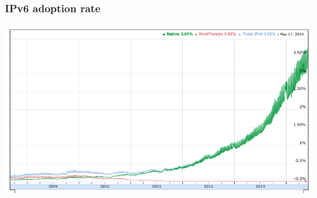 \documentclass[12pt,leqno,fleqn]{beamer}
\begin{document}

\begin{frame}
\frametitle{IPv6 adoption rate}
\includegraphics[keepaspectratio=true,width=1\textwidth]{adoption_rate.png}
\end{frame}

\end{document}

